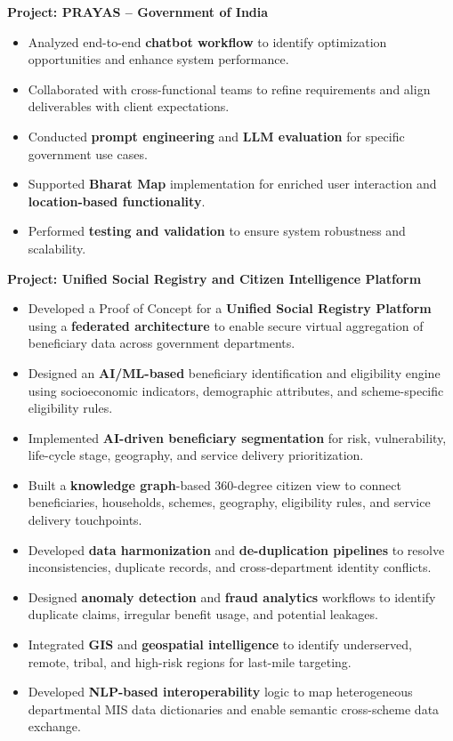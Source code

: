 \documentclass[letterpaper,11pt]{article}
\newcommand{\resumeItem}[1]{
  \item\small{
    {#1 \vspace{-2pt}}
  }
}
\newcommand{\resumeItemListStart}{\begin{itemize}}
\newcommand{\resumeItemListEnd}{\end{itemize}\vspace{-5pt}}
\begin{document}
      \vspace{4pt}
      \textbf{\small Project: PRAYAS -- Government of India}
      \resumeItemListStart
        \resumeItem{Analyzed end-to-end \textbf{chatbot workflow} to identify optimization opportunities and enhance system performance.}
        \resumeItem{Collaborated with cross-functional teams to refine requirements and align deliverables with client expectations.}
        \resumeItem{Conducted \textbf{prompt engineering} and \textbf{LLM evaluation} for specific government use cases.}
        \resumeItem{Supported \textbf{Bharat Map} implementation for enriched user interaction and \textbf{location-based functionality}.}
        \resumeItem{Performed \textbf{testing and validation} to ensure system robustness and scalability.}
      \resumeItemListEnd

      \vspace{4pt}
      \textbf{\small Project: Unified Social Registry and Citizen Intelligence Platform}
      \resumeItemListStart
        \resumeItem{Developed a Proof of Concept for a \textbf{Unified Social Registry Platform} using a \textbf{federated architecture} to enable secure virtual aggregation of beneficiary data across government departments.}
        \resumeItem{Designed an \textbf{AI/ML-based} beneficiary identification and eligibility engine using socioeconomic indicators, demographic attributes, and scheme-specific eligibility rules.}
        \resumeItem{Implemented \textbf{AI-driven beneficiary segmentation} for risk, vulnerability, life-cycle stage, geography, and service delivery prioritization.}
        \resumeItem{Built a \textbf{knowledge graph}-based 360-degree citizen view to connect beneficiaries, households, schemes, geography, eligibility rules, and service delivery touchpoints.}
        \resumeItem{Developed \textbf{data harmonization} and \textbf{de-duplication pipelines} to resolve inconsistencies, duplicate records, and cross-department identity conflicts.}
        \resumeItem{Designed \textbf{anomaly detection} and \textbf{fraud analytics} workflows to identify duplicate claims, irregular benefit usage, and potential leakages.}
        \resumeItem{Integrated \textbf{GIS} and \textbf{geospatial intelligence} to identify underserved, remote, tribal, and high-risk regions for last-mile targeting.}
        \resumeItem{Developed \textbf{NLP-based interoperability} logic to map heterogeneous departmental MIS data dictionaries and enable semantic cross-scheme data exchange.}
      \resumeItemListEnd
\end{document}

